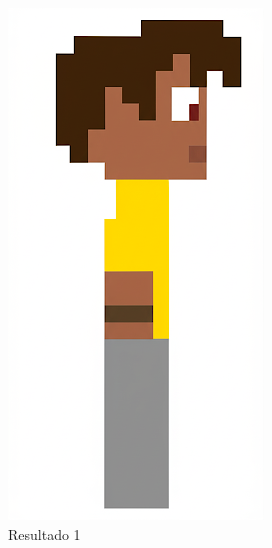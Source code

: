 \begin{figure}[htbp]
\begin{subfigure}{0.3\linewidth}
        \includegraphics[width=1\linewidth]{figs/geminiPro/chat6/tela1_res1.png}
        \caption{\small Resultado 1}
        \label{fig:geminiPro17a}
    \end{subfigure}
    \begin{subfigure}{0.3\linewidth}

\end{subfigure}
\end{figure}
